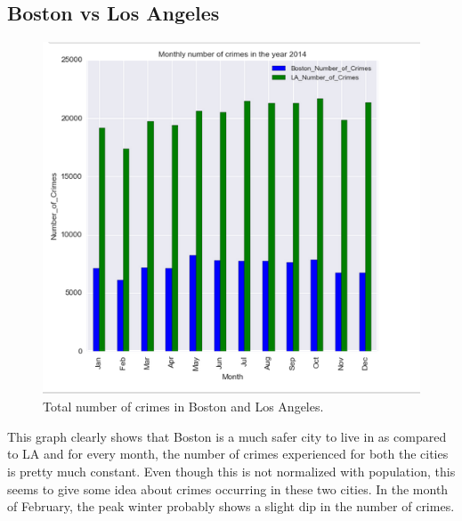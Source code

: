 \documentclass[journal, a4paper]{IEEEtran}
\begin{document}
\subsection{Boston vs Los Angeles}
    \begin{figure}[!hbt]
        \begin{center}
        \includegraphics[width=\columnwidth]{boston-la-total.png}
        \caption{Total number of crimes in Boston and Los Angeles.}
        \label{fig:tf_plot}
        \end{center}
    \end{figure}
This graph clearly shows that Boston is a much safer city to live in as compared to LA and for every month, the number of crimes experienced for both the cities is pretty much constant. Even though this is not normalized with population, this seems to give some idea about crimes occurring in these two cities. In the month of February, the peak winter probably shows a slight dip in the number of crimes.
\end{document}
